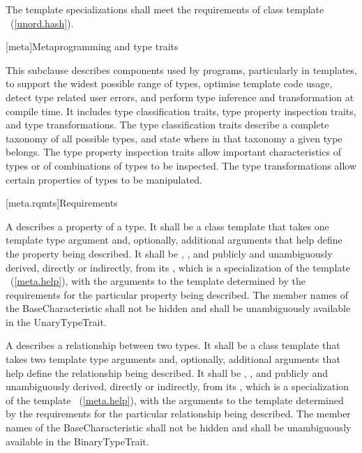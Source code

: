 \begin{itemdescr}
\pnum
The template specializations shall meet the requirements of class template
~(\ref{unord.hash}).
\end{itemdescr}


[meta]{Metaprogramming and type traits}

\pnum
This subclause describes components used by \Cpp programs, particularly in
templates, to support the widest possible range of types, optimise
template code usage, detect type related user errors, and perform
type inference and transformation at compile time. It includes type
classification traits, type property inspection traits, and type
transformations. The type classification traits describe a complete taxonomy
of all possible \Cpp types, and state where in that taxonomy a given
type belongs. The type property inspection traits allow important
characteristics of types or of combinations of types to be inspected. The
type transformations allow certain properties of types to be manipulated.

[meta.rqmts]{Requirements}

\pnum
A  describes a property
of a type. It shall be a class template that takes one template type
argument and, optionally, additional arguments that help define the
property being described. It shall be ,
,
and publicly and unambiguously derived, directly or indirectly, from
its , which is
a specialization of the template
~(\ref{meta.help}), with
the arguments to the template  determined by the
requirements for the particular property being described.
The member names of the BaseCharacteristic shall not be hidden and shall be
unambiguously available in the UnaryTypeTrait.

\pnum
A  describes a
relationship between two types. It shall be a class template that
takes two template type arguments and, optionally, additional
arguments that help define the relationship being described. It shall
be , ,
and publicly and unambiguously derived, directly or
indirectly, from
its , which is a specialization
of the template
~(\ref{meta.help}), with
the arguments to the template  determined by the
requirements for the particular relationship being described.
The member names of the BaseCharacteristic shall not be hidden and shall be
unambiguously available in the BinaryTypeTrait.


